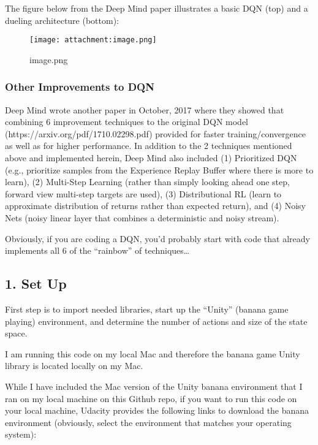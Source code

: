 \documentclass[11pt]{article}
\makeatletter
\def\maxwidth{\ifdim\Gin@nat@width>\linewidth\linewidth
    \else\Gin@nat@width\fi}
\let\Oldincludegraphics\includegraphics
\renewcommand{\includegraphics}[1]{\Oldincludegraphics[width=.8\maxwidth]{#1}}
\makeatother
\begin{document}
The figure below from the Deep Mind paper illustrates a basic DQN (top)
and a dueling architecture (bottom):

\begin{figure}
\centering
\texttt{[image: attachment:image.png]}
\caption{image.png}
\end{figure}

\hypertarget{other-improvements-to-dqn}{%
\subsubsection{Other Improvements to
DQN}\label{other-improvements-to-dqn}}

Deep Mind wrote another paper in October, 2017 where they showed that
combining 6 improvement techniques to the original DQN model
(https://arxiv.org/pdf/1710.02298.pdf) provided for faster
training/convergence as well as for higher performance. In addition to
the 2 techniques mentioned above and implemented herein, Deep Mind also
included (1) Prioritized DQN (e.g., prioritize samples from the
Experience Replay Buffer where there is more to learn), (2) Multi-Step
Learning (rather than simply looking ahead one step, forward view
multi-step targets are used), (3) Distributional RL (learn to
approximate distribution of returns rather than expected return), and
(4) Noisy Nets (noisy linear layer that combines a deterministic and
noisy stream).

Obviously, if you are coding a DQN, you'd probably start with code that
already implements all 6 of the ``rainbow'' of techniques\ldots{}

    \hypertarget{set-up}{%
\subsection{1. Set Up}\label{set-up}}

First step is to import needed libraries, start up the ``Unity'' (banana
game playing) environment, and determine the number of actions and size
of the state space.

I am running this code on my local Mac and therefore the banana game
Unity library is located locally on my Mac.

While I have included the Mac version of the Unity banana environment
that I ran on my local machine on this Github repo, if you want to run
this code on your local machine, Udacity provides the following links to
download the banana environment (obviously, select the environment that
matches your operating system):
\end{document}

